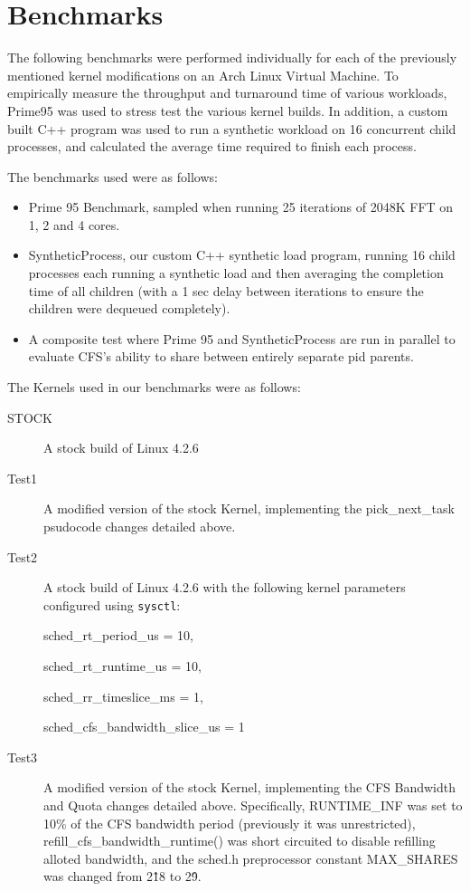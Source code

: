 \section{Benchmarks}

The following benchmarks were performed individually for each of the previously mentioned kernel modifications on an Arch Linux Virtual Machine. To empirically measure the throughput and turnaround time of various workloads, Prime95 was used to stress test the various kernel builds. In addition, a custom built C++ program was used to run a synthetic workload on 16 concurrent child processes, and calculated the average time required to finish each process.

The benchmarks used were as follows:
\begin{itemize}
	\item Prime 95 Benchmark, sampled when running 25 iterations of 2048K FFT on 1, 2 and 4 cores.
	\item SyntheticProcess, our custom C++ synthetic load program, running 16 child processes each running a synthetic load and then averaging the completion time of all children (with a 1 sec delay between iterations to ensure the children were dequeued completely).
	\item A composite test where Prime 95 and SyntheticProcess are run in parallel to evaluate CFS's ability to share between entirely separate pid parents.
\end{itemize}

\noindent The Kernels used in our benchmarks were as follows:
\begin{description}
	\item[STOCK] A stock build of Linux 4.2.6
	\item[Test1] A modified version of the stock Kernel, implementing the pick\_next\_task psudocode changes detailed above.
	\item[Test2] A stock build of Linux 4.2.6 with the following kernel parameters configured using \texttt{sysctl}:
	
		sched\_rt\_period\_us = 10, 
		
		sched\_rt\_runtime\_us = 10, 
		
		sched\_rr\_timeslice\_ms = 1, 
		
		sched\_cfs\_bandwidth\_slice\_us = 1
	\item[Test3] A modified version of the stock Kernel, implementing the CFS Bandwidth and Quota changes detailed above. Specifically, RUNTIME\_INF was set to 10\% of the CFS bandwidth period (previously it was unrestricted), refill\_cfs\_bandwidth\_runtime() was short circuited to disable refilling alloted bandwidth, and the sched.h preprocessor constant MAX\_SHARES was changed from 2\^18 to 2\^9.
\end{description}

